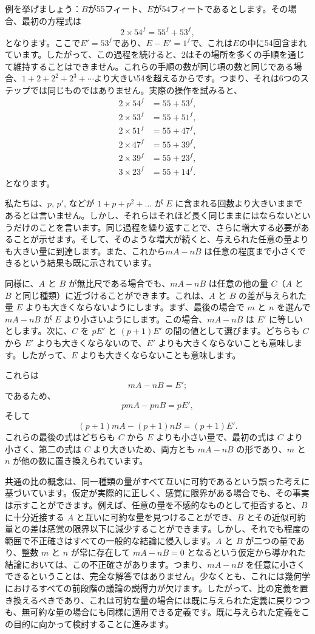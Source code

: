 \documentclass[a4paper,11pt,openany]{ltjsbook}
\begin{document}
例を挙げましょう：$B$が55フィート、$E$が54フィートであるとします。その場合、最初の方程式は
\[
2 \times 54^{f} = 55^{f} + 53^{f},
\]
となります。ここで$E' = 53^{f}$であり、$E - E' = 1^{f}$で、これは$E$の中に54回含まれています。したがって、この過程を続けると、2はその場所を多くの手順を通じて維持することはできません。これらの手順の数が同じ項の数と同じである場合、$1 + 2 + 2^{2} + 2^{3} + \cdots$より大きい54を超えるからです。つまり、それは6つのステップでは同じものではありません。実際の操作を試みると、
\begin{align*}
2 \times 54^{f} &= 55 + 53^{f}, \\
2 \times 53^{f} &= 55 + 51^{f}, \\
2 \times 51^{f} &= 55 + 47^{f}, \\
2 \times 47^{f} &= 55 + 39^{f}, \\
2 \times 39^{f} &= 55 + 23^{f}, \\
3 \times 23^{f} &= 55 + 14^{f}.
\end{align*}
となります。

私たちは、$p$, $p'$, などが $1 + p + p^2 + \dots$ が $E$ に含まれる回数より大きいままであるとは言いません。しかし、それらはそれほど長く同じままにはならないというだけのことを言います。同じ過程を繰り返すことで、さらに増大する必要があることが示せます。そして、そのような増大が続くと、与えられた任意の量よりも大きい量に到達します。また、これから$mA - nB$ は任意の程度まで小さくできるという結果も既に示されています。

同様に、$A$ と $B$ が無比尺である場合でも、$mA - nB$ は任意の他の量 $C$（$A$ と $B$ と同じ種類）に近づけることができます。これは、$A$ と $B$ の差が与えられた量 $E$ よりも大きくならないようにします。まず、最後の場合で $m$ と $n$ を選んで $mA - nB$ が $E$ より小さいようにします。この場合、$mA - nB$ は $E'$ に等しいとします。次に、$C$ を $pE'$ と $(p + 1)E'$ の間の値として選びます。どちらも $C$ から $E'$ よりも大きくならないので、$E'$ よりも大きくならないことも意味します。したがって、$E$ よりも大きくならないことも意味します。

これらは
\[
mA - nB = E';
\]
であるため、
\[
pmA - pnB = pE',
\]
そして
\[
(p + 1)mA - (p + 1)nB = (p + 1)E'.
\]
これらの最後の式はどちらも $C$ から $E$ よりも小さい量で、最初の式は $C$ より小さく、第二の式は $C$ より大きいため、両方とも $mA - nB$ の形であり、$m$ と $n$ が他の数に置き換えられています。

共通の比の概念は、同一種類の量がすべて互いに可約であるという誤った考えに基づいています。仮定が実際的に正しく、感覚に限界がある場合でも、その事実は示すことができます。例えば、任意の量を不感的なものとして拒否すると、$B$ に十分近接する $A$ と互いに可約な量を見つけることができ、$B$ とその近似可約量との差は感覚の限界以下に減少することができます。しかし、それでも程度の範囲で不正確さはすべての一般的な結論に侵入します。$A$ と $B$ が二つの量であり、整数 $m$ と $n$ が常に存在して $mA - nB = 0$ となるという仮定から導かれた結論においては、この不正確さがあります。つまり、$mA - nB$ を任意に小さくできるということは、完全な解答ではありません。少なくとも、これには幾何学におけるすべての前段階の議論の説得力が欠けます。したがって、比の定義を置き換えるべきであり、これは可約な量の場合には既に与えられた定義に戻りつつも、無可約な量の場合にも同様に適用できる定義です。既に与えられた定義をこの目的に向かって検討することに進みます。
\end{document}

